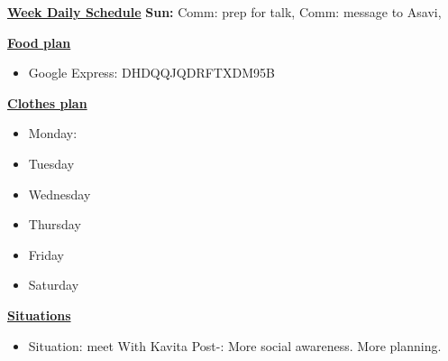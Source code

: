 \underline{\bf Week Daily Schedule}
        {\bf Sun:}  Comm: prep for talk, Comm: message to Asavi,
\fi






    
      
      \underline{ \bf Food plan } \\
        \begin{itemize}
          \tiny \item \tiny Google Express: DHDQQJQDRFTXDM95B
        \end{itemize}
        {\underline \bf Clothes plan} 
        \begin{itemize}
          \tiny \item \tiny Monday: 
        \item \tiny Tuesday
                    \item \tiny Wednesday
        \item \tiny Thursday
        \item \tiny Friday
        \item \tiny Saturday
        \end{itemize}

        {\underline \bf Situations}
        \begin{itemize}
          \tiny \item \tiny Situation: meet With Kavita  Post-: More social awareness. More planning.
          \end{itemize}

